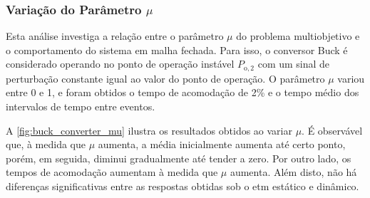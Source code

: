 \subsubsection{Variação do Parâmetro $\mu$ }

Esta análise investiga a relação entre o parâmetro $\mu$ do problema multiobjetivo e o comportamento do sistema em malha fechada. Para isso, o conversor Buck é considerado operando no ponto de operação instável $P_{\mathrm{o}, 2}$  com um sinal de perturbação constante igual ao valor do ponto de operação. O parâmetro $\mu$ variou entre 0 e 1, e foram obtidos o tempo de acomodação de 2\% e o tempo médio dos intervalos de tempo entre eventos.

A \autoref{fig:buck_converter_mu} ilustra os resultados obtidos ao variar $\mu$. É observável que, à medida que $\mu$ aumenta, a média inicialmente aumenta até certo ponto, porém, em seguida, diminui gradualmente até tender a zero. Por outro lado, os tempos de acomodação aumentam à medida que $\mu$ aumenta. Além disto, não há diferenças significativas entre as respostas obtidas sob o \acrshort{etm} estático e dinâmico.

